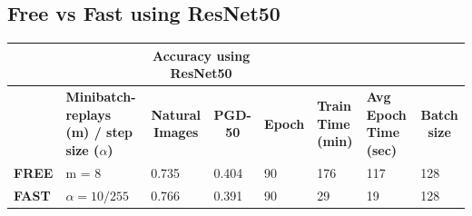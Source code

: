 \documentclass{article}
\begin{document}
\subsection{Free vs Fast using ResNet50}


\begin{table}[hbt!]
\begin{tabular}{|l|p{2.1cm}|c|l|l|l|l|l|}
\hline
              & \multicolumn{1}{l|}{}         & \multicolumn{2}{c|}{\textbf{Accuracy using ResNet50}}                         & \multicolumn{3}{l|}{\textbf{}}                                                                                                            & \textbf{}                                \\ \hline
 & \textbf{Minibatch-replays (m) / step size ($\alpha$)} & \textbf{Natural Images}                      & \multicolumn{1}{c|}{\textbf{PGD-50}} & \multicolumn{1}{c|}{\textbf{Epoch}} & \multicolumn{1}{p{1cm}|}{\textbf{Train Time (min)}} & \multicolumn{1}{p{1cm}|}{\textbf{Avg Epoch Time (sec)}} & \multicolumn{1}{c|}{\textbf{Batch size}} \\ \hline
\textbf{FREE} & m = 8 & \multicolumn{1}{l|}{0.735} & { 0.404}         & { 90}           & { 176}                     & { 117}                         & { 128}               \\ \hline
\textbf{FAST} & $\alpha = 10/255$       & \multicolumn{1}{l|}{0.766} & { 0.391}         & { 90}           & { 29}                     & { 19}                         & { 128}               \\ \hline
\end{tabular}
\end{table}

\newpage
\end{document}
